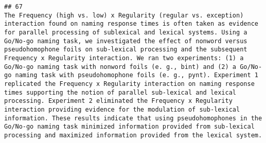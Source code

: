 \documentclass[
  english,
  man]{apa6}
\begin{document}
\begin{verbatim}
## 67                                                                                                                                                                                                                                                                                                                                                                                                                                                                                                                                                                                                                                                                                                                                                                                                                                                                                                                                                                                                                                                                                                                                                                                                                                                                                                                                                                                                                                                                                                                                                                                                                    The Frequency (high vs. low) x Regularity (regular vs. exception) interaction found on naming response times is often taken as evidence for parallel processing of sublexical and lexical systems. Using a Go/No-go naming task, we investigated the effect of nonword versus pseudohomophone foils on sub-lexical processing and the subsequent Frequency x Regularity interaction. We ran two experiments: (1) a Go/No-go naming task with nonword foils (e. g., bint) and (2) a Go/No-go naming task with pseudohomophone foils (e. g., pynt). Experiment 1 replicated the Frequency x Regularity interaction on naming response times supporting the notion of parallel sub-lexical and lexical processing. Experiment 2 eliminated the Frequency x Regularity interaction providing evidence for the modulation of sub-lexical information. These results indicate that using pseudohomophones in the Go/No-go naming task minimized information provided from sub-lexical processing and maximized information provided from the lexical system.

\end{verbatim}
\end{document}
